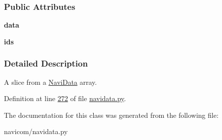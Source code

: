 \subsubsection*{Public Attributes}
\begin{DoxyCompactItemize}
\item 
\hypertarget{classnavicom_1_1navidata_1_1NaviSlice_a21ac86b9fbcb4ffc952782983690af5f}{
{\bfseries data}}
\label{classnavicom_1_1navidata_1_1NaviSlice_a21ac86b9fbcb4ffc952782983690af5f}

\item 
\hypertarget{classnavicom_1_1navidata_1_1NaviSlice_abc8769a0168ce54ee35624363deb0bcd}{
{\bfseries ids}}
\label{classnavicom_1_1navidata_1_1NaviSlice_abc8769a0168ce54ee35624363deb0bcd}

\end{DoxyCompactItemize}


\subsubsection{Detailed Description}
A slice from a \hyperlink{classnavicom_1_1navidata_1_1NaviData}{NaviData} array. 

Definition at line \hyperlink{navidata_8py_source_l00272}{272} of file \hyperlink{navidata_8py_source}{navidata.py}.



The documentation for this class was generated from the following file:\begin{DoxyCompactItemize}
\item 
navicom/navidata.py\end{DoxyCompactItemize}
